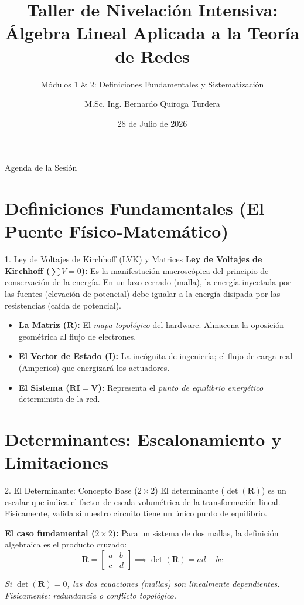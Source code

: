 \documentclass[aspectratio=169]{beamer}
\title[Nivelación - Sesión 1]{Taller de Nivelación Intensiva:\\ Álgebra Lineal Aplicada a la Teoría de Redes}
\subtitle{Módulos 1 \& 2: Definiciones Fundamentales y Sistematización}
\author[M.Sc. Ing. B. Quiroga Turdera]{M.Sc. Ing. Bernardo Quiroga Turdera}
\institute[UCB Tarija]{Carrera de Ingeniería Mecatrónica\\ Universidad Católica Boliviana "San Pablo" Sede Tarija}
\date{28 de Julio de 2026}
\begin{document}
\begin{frame}
    \titlepage
\end{frame}

\begin{frame}{Agenda de la Sesión}
    \tableofcontents
\end{frame}

\section{Definiciones Fundamentales (El Puente Físico-Matemático)}

\begin{frame}{1. Ley de Voltajes de Kirchhoff (LVK) y Matrices}
    \textbf{Ley de Voltajes de Kirchhoff ($\sum V = 0$):} Es la manifestación macroscópica del principio de conservación de la energía. En un lazo cerrado (malla), la energía inyectada por las fuentes (elevación de potencial) debe igualar a la energía disipada por las resistencias (caída de potencial).
    
    \vspace{0.3cm}
    \begin{itemize}
        \item \textbf{La Matriz ($\mathbf{R}$):} El \textit{mapa topológico} del hardware. Almacena la oposición geométrica al flujo de electrones.
        \item \textbf{El Vector de Estado ($\mathbf{I}$):} La incógnita de ingeniería; el flujo de carga real (Amperios) que energizará los actuadores.
        \item \textbf{El Sistema ($\mathbf{R}\mathbf{I} = \mathbf{V}$):} Representa el \textit{punto de equilibrio energético} determinista de la red.
    \end{itemize}
\end{frame}

\section{Determinantes: Escalonamiento y Limitaciones}

\begin{frame}{2. El Determinante: Concepto Base ($2\times2$)}
    El determinante ($\det(\mathbf{R})$) es un escalar que indica el factor de escala volumétrica de la transformación lineal. Físicamente, valida si nuestro circuito tiene un único punto de equilibrio.
    
    \vspace{0.3cm}
    \textbf{El caso fundamental ($2\times2$):}
    Para un sistema de dos mallas, la definición algebraica es el producto cruzado:
    \begin{equation*}
        \mathbf{R} = \begin{bmatrix} a & b \\ c & d \end{bmatrix} \implies \det(\mathbf{R}) = ad - bc
    \end{equation*}
    
    \textit{Si $\det(\mathbf{R}) = 0$, las dos ecuaciones (mallas) son linealmente dependientes. Físicamente: redundancia o conflicto topológico.}
\end{frame}
\end{document}
